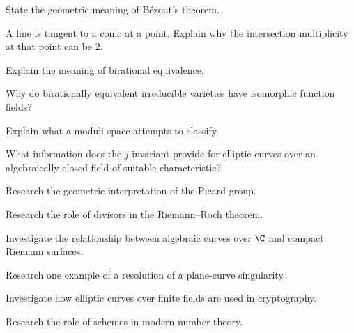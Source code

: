 \begin{exercise}[3]
State the geometric meaning of B\'ezout's theorem.
\end{exercise}

\begin{exercise}[3]
A line is tangent to a conic at a point. Explain why the intersection
multiplicity at that point can be \(2\).
\end{exercise}

\begin{exercise}[3]
Explain the meaning of birational equivalence.
\end{exercise}

\begin{exercise}[3]
Why do birationally equivalent irreducible varieties have isomorphic
function fields?
\end{exercise}

\begin{exercise}[3]
Explain what a moduli space attempts to classify.
\end{exercise}

\begin{exercise}[3]
What information does the \(j\)-invariant provide for elliptic curves over
an algebraically closed field of suitable characteristic?
\end{exercise}

\begin{exercise}[4]
Research the geometric interpretation of the Picard group.
\end{exercise}

\begin{exercise}[4]
Research the role of divisors in the Riemann--Roch theorem.
\end{exercise}

\begin{exercise}[4]
Investigate the relationship between algebraic curves over \(\C\) and compact
Riemann surfaces.
\end{exercise}

\begin{exercise}[4]
Research one example of a resolution of a plane-curve singularity.
\end{exercise}

\begin{exercise}[4]
Investigate how elliptic curves over finite fields are used in cryptography.
\end{exercise}

\begin{exercise}[4]
Research the role of schemes in modern number theory.
\end{exercise}

